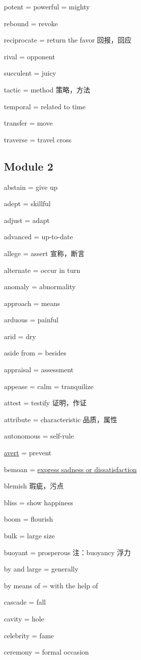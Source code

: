 \documentclass[UTF8, fontset = none, zihao = -4, linespread = 1.1]{ctexart}
\begin{document}
\begin{multicols}{2}
potent = powerful = mighty

rebound = revoke

reciprocate = return the favor 回报，回应

rival = opponent

succulent = juicy

tactic = method 策略，方法

temporal = related to time

transfer = move

traverse = travel cross

\subsection*{Module 2}
abstain = give up

adept = skillful

adjust = adapt

advanced = up-to-date

allege = assert 宣称，断言

alternate = occur in turn

anomaly = abnormality

approach = means

arduous = painful

arid = dry

aside from = besides

appraisal = assessment

appease = calm = tranquilize

attest = testify 证明，作证

attribute = characteristic 品质，属性

autonomous = self-rule

\underline{avert} = prevent

bemoan = \underline{express sadness or dissatisfaction}

blemish 瑕疵，污点

bliss = show happiness

boom = flourish

bulk = large size

buoyant = prosperous 注：buoyancy 浮力

by and large = generally

by means of = with the help of

cascade = fall

cavity = hole

celebrity = fame

ceremony = formal occasion


\end{multicols}
\end{document}
